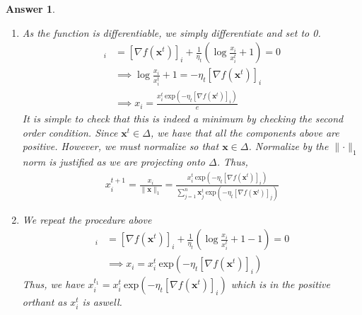 \documentclass[12pt]{article}
\theoremstyle{colon}
\newtheorem*{answer}{Answer}
\begin{document}
\begin{answer}
	\

	\begin{enumerate}[label=\alph*)]
		\item As the function is differentiable, we simply differentiate and set to 0.
			\begin{align*}
				[\nabla_{\bm{x}}]_i &= [\nabla f(\bm{x}^t)]_i + \frac{1}{\eta_t} \left( \log \frac{x_i}{x_i^t} + 1 \right) = 0 \\
				&\implies \log \frac{x_i}{x_i^t} + 1 = -\eta_t [\nabla f(\bm{x}^t)]_i \\
				&\implies x_i = \frac{x_i^t \ \text{exp}(-\eta_t [\nabla f(\bm{x}^t)]_i)}{e}
			\end{align*}
			It is simple to check that this is indeed a minimum by checking the second order condition. Since $\bm{x}^t \in \Delta$, we have that all the components above are positive. However, we must normalize so that $\bm{x} \in \Delta$. Normalize by the $\lVert \cdot \rVert_1$ norm is justified as we are projecting onto $\Delta$. Thus,
			\begin{gather*}
				x_i^{t+1} = \frac{x_i}{\lVert \bm{x} \rVert_1} = \frac{x_i^t \ \text{exp}(-\eta_t [\nabla f(\bm{x}^t)]_i)}{\sum_{j=1}^n \bm{x}_j^t \ \text{exp}(-\eta_t [\nabla f(\bm{x}^t)]_j)} 
			\end{gather*}

		\item We repeat the procedure above
			\begin{align*}
				[\nabla_{\bm{x}}]_i &= [\nabla f(\bm{x}^t)]_i + \frac{1}{\eta_t} \left( \log \frac{x_i}{x_i^t} + 1 - 1 \right) = 0 \\
				&\implies x_i = x_i^t \ \text{exp}(-\eta_t [\nabla f(\bm{x}^t)]_i)
			\end{align*}
			Thus, we have $x_i^{t_1} = x_i^t \ \text{exp}(-\eta_t [\nabla f(\bm{x}^t)]_i)$ which is in the positive orthant as $x_i^t$ is aswell.

	\end{enumerate}

\end{answer}

\clearpage
\end{document}
